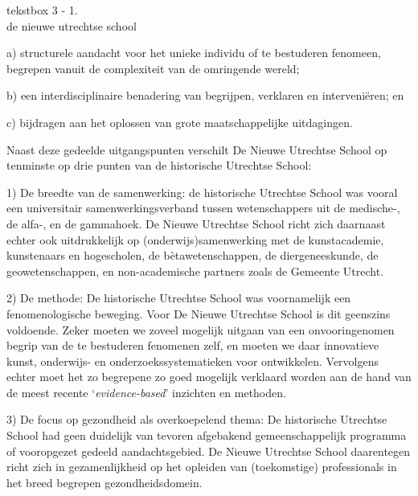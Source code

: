 \documentclass[smallauthor, chapterhaspagenum, nochapterinheader, pagenuminheader,  bigchapnum,medium2, tocpages, garamond, titleinheader]{jote-book}
\begin{document}
\begin{bookbox}{\raggedright tekstbox 3 - 1. \\de nieuwe utrechtse school}
		a) structurele aandacht voor het unieke individu of te bestuderen fenomeen, begrepen vanuit de complexiteit van de omringende wereld;

		\vspace*{\baselineskip}

		b) een interdisciplinaire benadering van begrijpen, verklaren en interveniëren; en

		\vspace*{\baselineskip}

		c) bijdragen aan het oplossen van grote maatschappelijke uitdagingen.

		\vspace*{\baselineskip}

		Naast deze gedeelde uitgangspunten verschilt De Nieuwe Utrechtse School op tenminste op drie punten van de historische Utrechtse School:

		\vspace*{\baselineskip}

		1) De breedte van de samenwerking: de historische Utrechtse School was vooral een universitair samenwerkingsverband tussen wetenschappers uit de medische-, de alfa-, en de gammahoek. De Nieuwe Utrechtse School richt zich daarnaast echter ook uitdrukkelijk op (onderwijs)samenwerking met de kunstacademie, kunstenaars en hogescholen, de bètawetenschappen, de diergeneeskunde, de geowetenschappen, en non-academische partners zoals de Gemeente Utrecht.

		\vspace*{\baselineskip}

		2) De methode: De historische Utrechtse School was voornamelijk een fenomenologische beweging. Voor De Nieuwe Utrechtse School is dit geenszins voldoende. Zeker moeten we zoveel mogelijk uitgaan van een onvooringenomen begrip van de te bestuderen fenomenen zelf, en moeten we daar innovatieve kunst, onderwijs- en onderzoekssystematieken voor ontwikkelen. Vervolgens echter moet het zo begrepene zo goed mogelijk verklaard worden aan de hand van de meest recente ‘\emph{evidence-based}' inzichten en methoden.

		\vspace*{\baselineskip}

		3) De focus op gezondheid als overkoepelend thema: De historische Utrechtse School had geen duidelijk van tevoren afgebakend gemeenschappelijk programma of vooropgezet gedeeld aandachtsgebied. De Nieuwe Utrechtse School daarentegen richt zich in gezamenlijkheid op het opleiden van (toekomstige) professionals in het breed begrepen gezondheidsdomein.
	\end{bookbox}
\end{document}
